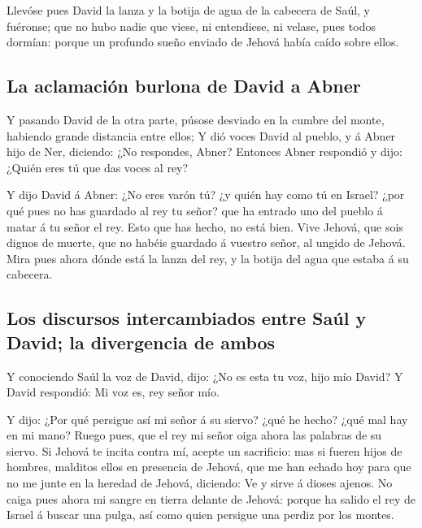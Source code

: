  Llevóse pues David la lanza y la botija de agua de la
cabecera de Saúl, y fuéronse; que no hubo nadie que viese, ni
entendiese, ni velase, pues todos dormían: porque un profundo sueño
enviado de Jehová había caído sobre ellos.

\hypertarget{la-aclamaciuxf3n-burlona-de-david-a-abner}{%
\subsection{La aclamación burlona de David a
Abner}\label{la-aclamaciuxf3n-burlona-de-david-a-abner}}

 Y pasando David de la otra parte, púsose desviado en la
cumbre del monte, habiendo grande distancia entre ellos; 
Y dió voces David al pueblo, y á Abner hijo de Ner, diciendo: ¿No
respondes, Abner? Entonces Abner respondió y dijo: ¿Quién eres tú que
das voces al rey?

 Y dijo David á Abner: ¿No eres varón tú? ¿y quién hay
como tú en Israel? ¿por qué pues no has guardado al rey tu señor? que ha
entrado uno del pueblo á matar á tu señor el rey.  Esto
que has hecho, no está bien. Vive Jehová, que sois dignos de muerte, que
no habéis guardado á vuestro señor, al ungido de Jehová. Mira pues ahora
dónde está la lanza del rey, y la botija del agua que estaba á su
cabecera.

\hypertarget{los-discursos-intercambiados-entre-sauxfal-y-david-la-divergencia-de-ambos}{%
\subsection{Los discursos intercambiados entre Saúl y David; la
divergencia de
ambos}\label{los-discursos-intercambiados-entre-sauxfal-y-david-la-divergencia-de-ambos}}

 Y conociendo Saúl la voz de David, dijo: ¿No es esta tu
voz, hijo mío David? Y David respondió: Mi voz es, rey señor mío.

 Y dijo: ¿Por qué persigue así mi señor á su siervo? ¿qué
he hecho? ¿qué mal hay en mi mano?  Ruego pues, que el
rey mi señor oiga ahora las palabras de su siervo. Si Jehová te incita
contra mí, acepte un sacrificio: mas si fueren hijos de hombres,
malditos ellos en presencia de Jehová, que me han echado hoy para que no
me junte en la heredad de Jehová, diciendo: Ve y sirve á dioses ajenos.
 No caiga pues ahora mi sangre en tierra delante de
Jehová: porque ha salido el rey de Israel á buscar una pulga, así como
quien persigue una perdiz por los montes.

